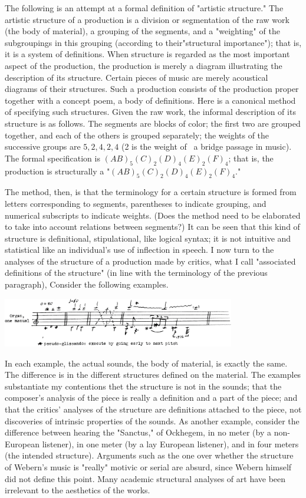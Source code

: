 The following is an attempt at a formal definition of "artistic structure." 
The artistic structure of a production is a division or segmentation of the raw work 
(the body of material), a grouping of the segments, and a "weighting" of the subgroupings 
in this grouping (according to their"structural importance"); that is, it is a system 
of definitions. When structure is regarded as the most important aspect of the 
production, the production is merely a diagram illustrating the description of its 
structure. Certain pieces of music are merely acoustical diagrams of their structures. 
Such a production consists of the production proper together with a concept poem, a 
body of definitions. Here is a canonical method of specifying such structures. 
Given the raw work, the informal description of its structure is as follows. The 
segments are blocks of color; the first two are grouped together, and each of the 
others is grouped separately; the weights of the successive groups are $5, 2, 4, 2, 4$
(2 is the weight of \eg\ a bridge passage in music). The formal specification is 
$(AB)_5(C)_2(D)_4(E)_2(F)_4$;  that is, the production is structurally a "$(AB)_5(C)_2(D)_4(E)_2(F)_4$."


The method, then, is that the terminology for a certain structure is formed from 
letters corresponding to segments, parentheses to indicate grouping, and numerical 
subscripts to indicate weights. (Does the method need to be elaborated to take into 
account relations between segments?) It can be seen that this kind of structure is 
definitional, stipulational, like logical syntax; it is not intuitive and statistical 
like an individual's use of inflection in speech. I now turn to the analyses of 
the structure of a production made by critics, what I call "associated definitions of the 
structure" (in line with the terminology of the previous paragraph), Consider the 
following examples. 

\includegraphics[width=4in]{img/structure_art}

In each example, the actual sounds, the body of material, is exactly the same. 
The difference is in the different structures defined on the material. The examples 
substantiate my contentions thet the structure is not in the sounds; that the composer's 
analysis of the piece is really a definition and a part of the piece; and that the 
critics' analyses of the structure are definitions attached to the piece, not discoveries 
of intrinsic properties of the sounds. As another example, consider the difference 
between hearing the "Sanctus,"  of Ockhegem, in no meter (by 
a non-European listener), in one meter (by a lay European listener), and in four 
meters (the intended structure). Arguments such as the one over whether the structure 
of Webern's music is "really" motivic or serial are absurd, since Webern himself did not 
define this point. Many academic structural analyses of art have been irrelevant 
to the aesthetics of the works. 

